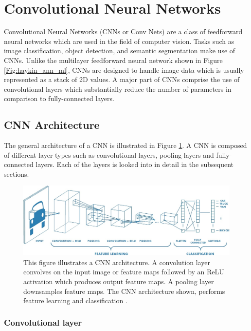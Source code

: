 \section{Convolutional Neural Networks}
\label{section:cnn}

Convolutional Neural Networks (CNNs or Conv Nets) are a class of feedforward neural networks which are used in the field of computer vision. Tasks such as image classification, object detection, and semantic segmentation make use of CNNs. Unlike the multilayer feedforward neural network shown in Figure \ref{Fig:haykin_ann_ml}, CNNs are designed to handle image data which is usually represented as a stack of 2D values. A major part of CNNs comprise the use of convolutional layers which substantially reduce the number of parameters in comparison to fully-connected layers.

\subsection{CNN Architecture}

The general architecture of a CNN is illustrated in Figure \ref{Fig:cnn_arch}. A CNN is composed of different layer types such as convolutional layers, pooling layers and fully-connected layers. Each of the layers is looked into in detail in the subsequent sections.
	
	\begin{figure}[h]
		\centering
		\includegraphics[width=1\linewidth]{images/cnn_matlab}
		\caption{This figure illustrates a CNN architecture. A convolution layer convolves on the input image or feature maps followed by an ReLU activation which produces output feature maps. A pooling layer downsamples feature maps. The CNN architecture shown, performs feature learning and classification \cite{matlab_cnn}.}
		\label{Fig:cnn_arch}
	\end{figure}

\subsubsection{Convolutional layer}


